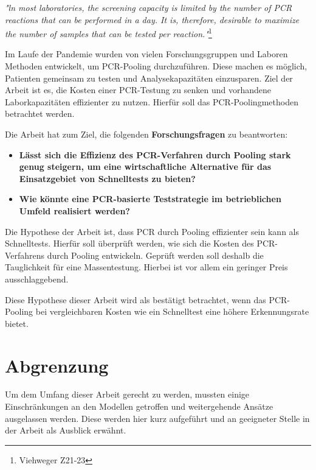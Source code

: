 \textit{"ln most laboratories, the screening capacity is limited by the number of PCR reactions that can be performed in a day. It is, therefore, desirable to maximize the number of samples that can be tested per reaction."}\footnote{Viehweger Z21-23}

Im Laufe der Pandemie wurden von vielen Forschungsgruppen und Laboren Methoden entwickelt, um PCR-Pooling durchzuführen.
Diese machen es möglich, Patienten gemeinsam zu testen und Analysekapazitäten einzusparen.
Ziel der Arbeit ist es, die Kosten einer PCR-Testung zu senken und vorhandene Laborkapazitäten effizienter zu nutzen.
Hierfür soll das PCR-Poolingmethoden betrachtet werden.

Die Arbeit hat zum Ziel, die folgenden \textbf{Forschungsfragen} zu beantworten:

\begin{itemize}
	\item \textbf{Lässt sich die Effizienz des PCR-Verfahren durch Pooling stark genug steigern, um eine wirtschaftliche Alternative für das Einsatzgebiet von Schnelltests zu bieten?}
	\item \textbf{Wie könnte eine PCR-basierte Teststrategie im betrieblichen Umfeld realisiert werden?}
\end{itemize}

Die Hypothese der Arbeit ist, dass PCR durch Pooling effizienter sein kann als Schnelltests.
Hierfür soll überprüft werden, wie sich die Kosten des PCR-Verfahrens durch Pooling entwickeln.
Geprüft werden soll deshalb die Tauglichkeit für eine Massentestung.
Hierbei ist vor allem ein geringer Preis ausschlaggebend.

Diese Hypothese dieser Arbeit wird als bestätigt betrachtet, wenn das PCR-Pooling bei vergleichbaren Kosten wie ein Schnelltest eine höhere Erkennungsrate bietet.

\cleardoublepage
\section{Abgrenzung}
Um dem Umfang dieser Arbeit gerecht zu werden, mussten einige Einschränkungen an den Modellen getroffen und weitergehende Ansätze ausgelassen werden.
Diese werden hier kurz aufgeführt und an geeigneter Stelle in der Arbeit als Ausblick erwähnt.

